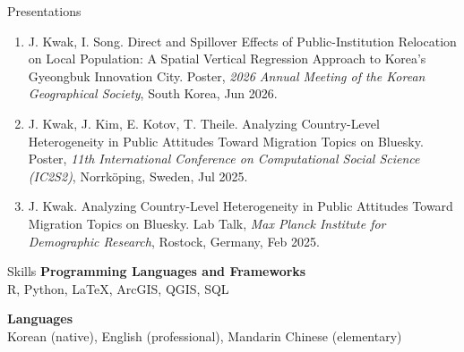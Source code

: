 \documentclass{resume} %
\begin{document}
	\begin{rSection}{Presentations}
		\begin{enumerate}
			\item J. Kwak, I. Song. Direct and Spillover Effects of Public-Institution Relocation on Local Population: A Spatial Vertical Regression Approach to Korea's Gyeongbuk Innovation City. Poster, \textit{2026 Annual Meeting of the Korean Geographical Society},
			South Korea, Jun 2026.
			\item J. Kwak, J. Kim, E. Kotov, T. Theile. Analyzing Country-Level Heterogeneity in Public Attitudes
			Toward Migration Topics on Bluesky. Poster, \textit{11th International Conference on Computational
				Social Science (IC2S2)}, Norrk\"oping, Sweden, Jul 2025.
			\item J. Kwak. Analyzing Country-Level Heterogeneity in Public Attitudes
			Toward Migration Topics on Bluesky.  Lab Talk, \textit{Max Planck Institute for
				Demographic Research}, Rostock, Germany, Feb 2025.
		\end{enumerate}
	\end{rSection}
	\begin{rSection}{Skills}
		{\bf Programming Languages and Frameworks}\\
		R, Python, \LaTeX, ArcGIS, QGIS, SQL
		
		\vspace{4pt}
		{\bf Languages}\\
		Korean (native), English (professional), Mandarin Chinese (elementary)
	\end{rSection}
\end{document}
